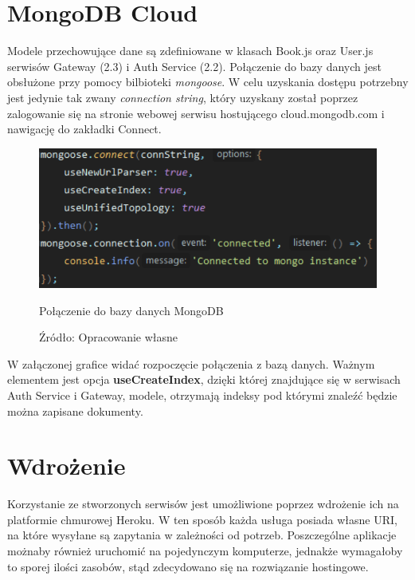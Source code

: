 \newpage
\section{MongoDB Cloud}
Modele przechowujące dane są zdefiniowane w klasach Book.js oraz User.js serwisów Gateway (2.3) i Auth Service (2.2). Połączenie do bazy danych jest obsłużone przy pomocy bilbioteki \textit{mongoose}.\newline
W celu uzyskania dostępu potrzebny jest jedynie tak zwany \textit{connection string}, który uzyskany został poprzez zalogowanie się na stronie webowej serwisu hostującego cloud.mongodb.com i nawigację do zakładki Connect.
\begin{figure}[H]
	\centering
	\includegraphics[width=\linewidth]{mongo.pdf}
	\caption{\centering Połączenie do bazy danych MongoDB}
	\caption*{\centering Źródło: {Opracowanie własne}}
\end{figure}
W załączonej grafice widać rozpoczęcie połączenia z bazą danych. Ważnym elementem jest opcja \textbf{useCreateIndex}, dzięki której znajdujące się w serwisach Auth Service i Gateway, modele, otrzymają indeksy pod którymi znaleźć będzie można zapisane dokumenty. 


\section{Wdrożenie}

Korzystanie ze stworzonych serwisów jest umożliwione poprzez wdrożenie ich na platformie chmurowej Heroku.
W ten sposób każda usługa posiada własne URI, na które wysyłane są zapytania w zależności od potrzeb.
Poszczególne aplikacje możnaby również uruchomić na pojedynczym komputerze, jednakże wymagałoby to sporej ilości zasobów, stąd zdecydowano się na rozwiązanie hostingowe.

